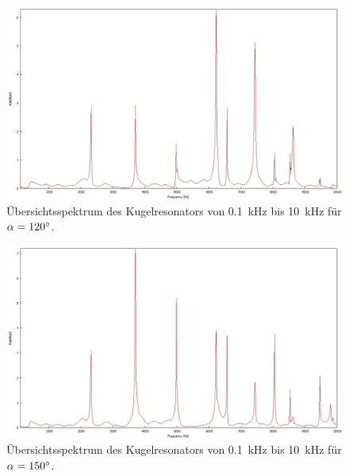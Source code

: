 \begin{figure}
\includegraphics[width=\textwidth]{content/messungen/Chapter2new/2_1_120img.jpg}
\caption{Übersichtsspektrum des Kugelresonators von 0.1~kHz bis 10~kHz für $\alpha=120\degree$.}
\label{fig:2_1_120}
\end{figure}

\begin{figure}
\includegraphics[width=\textwidth]{content/messungen/Chapter2new/2_1_150img.jpg}
\caption{Übersichtsspektrum des Kugelresonators von 0.1~kHz bis 10~kHz für $\alpha=150\degree$.}
\label{fig:2_1_150}
\end{figure}

